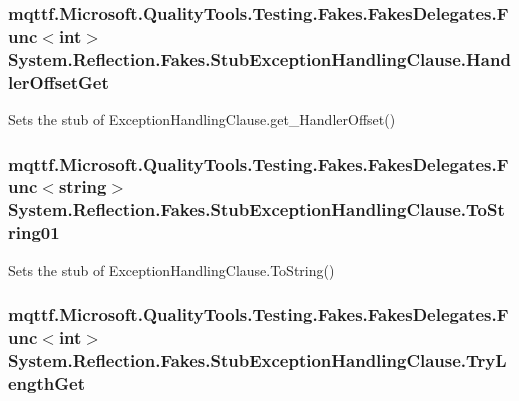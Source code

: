 \hypertarget{class_system_1_1_reflection_1_1_fakes_1_1_stub_exception_handling_clause_a54a2071a343a4f6de4ace5659866e5ae}{
\subsubsection[{Handler\-Offset\-Get}]{\setlength{\rightskip}{0pt plus 5cm}mqttf.\-Microsoft.\-Quality\-Tools.\-Testing.\-Fakes.\-Fakes\-Delegates.\-Func$<$int$>$ System.\-Reflection.\-Fakes.\-Stub\-Exception\-Handling\-Clause.\-Handler\-Offset\-Get}}\label{class_system_1_1_reflection_1_1_fakes_1_1_stub_exception_handling_clause_a54a2071a343a4f6de4ace5659866e5ae}


Sets the stub of Exception\-Handling\-Clause.\-get\-\_\-\-Handler\-Offset()

\hypertarget{class_system_1_1_reflection_1_1_fakes_1_1_stub_exception_handling_clause_a6a1c7f07c3ad82a14a007d2c2dda21f8}{
\subsubsection[{To\-String01}]{\setlength{\rightskip}{0pt plus 5cm}mqttf.\-Microsoft.\-Quality\-Tools.\-Testing.\-Fakes.\-Fakes\-Delegates.\-Func$<$string$>$ System.\-Reflection.\-Fakes.\-Stub\-Exception\-Handling\-Clause.\-To\-String01}}\label{class_system_1_1_reflection_1_1_fakes_1_1_stub_exception_handling_clause_a6a1c7f07c3ad82a14a007d2c2dda21f8}


Sets the stub of Exception\-Handling\-Clause.\-To\-String()

\hypertarget{class_system_1_1_reflection_1_1_fakes_1_1_stub_exception_handling_clause_a64382657fc14dff034dad85c9c6d36dd}{
\subsubsection[{Try\-Length\-Get}]{\setlength{\rightskip}{0pt plus 5cm}mqttf.\-Microsoft.\-Quality\-Tools.\-Testing.\-Fakes.\-Fakes\-Delegates.\-Func$<$int$>$ System.\-Reflection.\-Fakes.\-Stub\-Exception\-Handling\-Clause.\-Try\-Length\-Get}}\label{class_system_1_1_reflection_1_1_fakes_1_1_stub_exception_handling_clause_a64382657fc14dff034dad85c9c6d36dd}


